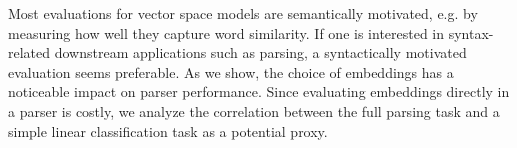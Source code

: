 Most evaluations for vector space models are semantically motivated, e.g. by measuring how well they capture word similarity.  If one is interested in syntax-related downstream applications such as parsing, a syntactically motivated evaluation seems preferable.  As we show, the choice of embeddings has a noticeable impact on parser performance.  Since evaluating embeddings directly in a parser is costly, we analyze the correlation between the full parsing task and a simple linear classification task as a potential proxy.
